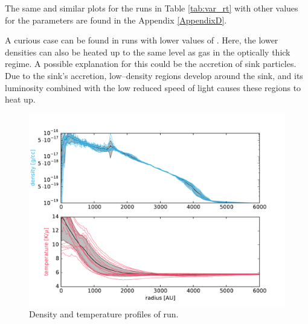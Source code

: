 The same and similar plots for the runs in Table \ref{tab:var_rt} with other values for the parameters are found in the Appendix \ref{AppendixD}.

A curious case can be found in runs with lower values of .
Here, the lower densities can also be heated up to the same level as gas in the optically thick regime.
A possible explanation for this could be the accretion of sink particles.
Due to the sink's accretion, low--density regions develop around the sink, and its luminosity combined with the low reduced speed of light causes these regions to heat up.

\begin{figure}[!htb]
 \centering
 \includegraphics[width=1.0\textwidth]{Figures/var_rt_profiles/timeave_n1c10_6000AU_80_85kyrs}
 \captionsetup{justification=justified,singlelinecheck=false,width=\linewidth}
 \decoRule
 \caption[Density and temperature profiles]{Density and temperature profiles of  run.
}
\end{figure}

